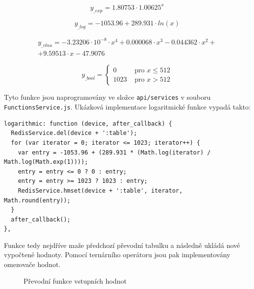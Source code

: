 \begin{equation}
	y_{\_exp} = 1.80753 \cdot 1.00625^x
	\label{eq:exp}
\end{equation}

\begin{equation}
	y_{\_log} = -1053.96 + 289.931 \cdot ln(x)
	\label{eq:log}
\end{equation}

\begin{multline}
	y_{\_vlna} = -3.23206 \cdot 10^{-8} \cdot x^4 + 0.000068 \cdot x^3 - 0.044362 \cdot x^2 + \\
				+9.59513 \cdot x - 47.9076
	\label{eq:vlna}
\end{multline}

\begin{equation}
	y_{\_bool} = \left\{
		\begin{matrix}
			0 & \mbox{ pro }x \leq 512 \\
			1023 & \mbox{ pro }x > 512
		\end{matrix}
	\right.
	\label{eq:bool}
\end{equation}

Tyto funkce jsou naprogramovány ve složce \texttt{api/services} v souboru \texttt{FunctionsService.js}. Ukázková implementace logaritmické funkce vypadá takto:

\begin{verbatim}
logarithmic: function (device, after_callback) {
  RedisService.del(device + ':table');
  for (var iterator = 0; iterator <= 1023; iterator++) {
    var entry = -1053.96 + (289.931 * (Math.log(iterator) / Math.log(Math.exp(1))));
    entry = entry <= 0 ? 0 : entry;
    entry = entry >= 1023 ? 1023 : entry;
    RedisService.hmset(device + ':table', iterator, Math.round(entry));
  }
  after_callback();
},
\end{verbatim}

Funkce tedy nejdříve maže předchozí převodní tabulku a následně ukládá nové vypočtené hodnoty. Pomocí ternárního operátoru jsou pak implementovány omezovače hodnot.

\begin{figure}[h]
	\caption{Převodní funkce vstupních hodnot}
\end{figure}

